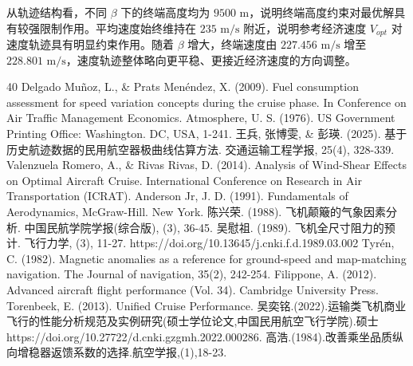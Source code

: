 \documentclass[UTF8]{ctexart}
\begin{document}
从轨迹结构看，不同 $\beta$ 下的终端高度均为 $9500\text{ m}$，说明终端高度约束对最优解具有较强限制作用。平均速度始终维持在 $235\text{ m/s}$ 附近，说明参考经济速度 $V_{opt}$ 对速度轨迹具有明显约束作用。随着 $\beta$ 增大，终端速度由 $227.456\text{ m/s}$ 增至 $228.801\text{ m/s}$，速度轨迹整体略向更平稳、更接近经济速度的方向调整。
\newpage
\begin{thebibliography}{40}
	Delgado Muñoz, L., \& Prats Menéndez, X. (2009). Fuel consumption assessment for speed variation concepts during the cruise phase. In Conference on Air Traffic Management Economics.
	Atmosphere, U. S. (1976). US Government Printing Office: Washington. DC, USA, 1-241.
    王兵, 张博雯, \& 彭瑛. (2025). 基于历史航迹数据的民用航空器极曲线估算方法. 交通运输工程学报, 25(4), 328-339.
	Valenzuela Romero, A., \& Rivas Rivas, D. (2014). Analysis of Wind-Shear Effects on Optimal Aircraft Cruise. International Conference on Research in Air Transportation (ICRAT).
    Anderson Jr, J. D. (1991). Fundamentals of Aerodynamics, McGraw-Hill. New York.
    陈兴荣. (1988). 飞机颠簸的气象因素分析. 中国民航学院学报(综合版), (3), 36-45.
    吴慰祖. (1989). 飞机全尺寸阻力的预计. 飞行力学, (3), 11-27. https://doi.org/10.13645/j.cnki.f.d.1989.03.002
    Tyrén, C. (1982). Magnetic anomalies as a reference for ground-speed and map-matching navigation. The Journal of navigation, 35(2), 242-254.
    Filippone, A. (2012). Advanced aircraft flight performance (Vol. 34). Cambridge University Press.
    Torenbeek, E. (2013). Unified Cruise Performance.
    吴奕铭.(2022).运输类飞机商业飞行的性能分析规范及实例研究(硕士学位论文,中国民用航空飞行学院).硕士https://doi.org/10.27722/d.cnki.gzgmh.2022.000286.
    高浩.(1984).改善乘坐品质纵向增稳器返馈系数的选择.航空学报,(1),18-23.
\end{thebibliography}
\newpage
{}	%
\end{document}
